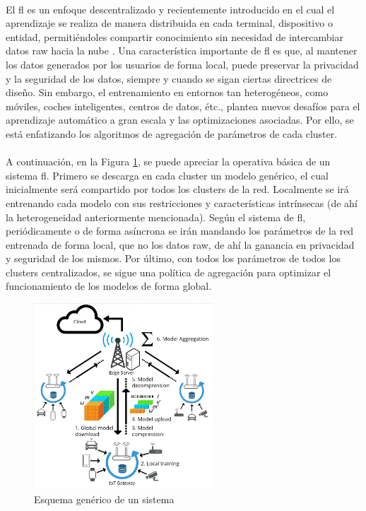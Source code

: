 \\
El \gls{fl} es un enfoque descentralizado y recientemente introducido en el cual el aprendizaje se realiza de manera distribuida en cada terminal, dispositivo o entidad, permitiéndoles compartir conocimiento sin necesidad de intercambiar datos raw hacia la nube \cite{mcmahan2017communication}. Una característica importante de \gls{fl} es que, al mantener los datos generados por los usuarios de forma local, puede preservar la privacidad y la seguridad de los datos, siempre y cuando se sigan ciertas directrices de diseño. Sin embargo, el entrenamiento en entornos tan heterogéneos, como móviles, coches inteligentes, centros de datos, étc., plantea nuevos desafíos para el aprendizaje automático a gran escala y las optimizaciones asociadas. Por ello, se está enfatizando los algoritmos de agregación de parámetros de cada cluster.\\
\\
A continuación, en la Figura \ref{fig:fl}, se puede apreciar la operativa básica de un sistema \gls{fl}. Primero se descarga en cada cluster un modelo genérico, el cual inicialmente será compartido por todos los clusters de la red. Localmente se irá entrenando cada modelo con sus restricciones y características intrínsecas (de ahí la heterogeneidad anteriormente mencionada). Según el sistema de \gls{fl}, periódicamente o de forma asíncrona se irán mandando los parámetros de la red entrenada de forma local, que no los datos raw, de ahí la ganancia en privacidad y seguridad de los mismos. Por último, con todos los parámetros de todos los clusters centralizados, se sigue una política de agregación para optimizar el funcionamiento de los modelos de forma global.\\

\begin{figure}[h!]
    \centering
    \includegraphics[width=0.6\textwidth]{archivos/img/teoria/fl.jpg}
    \caption{Esquema genérico de un sistema  \cite{mills2019communication}}
    \label{fig:fl}
\end{figure}


